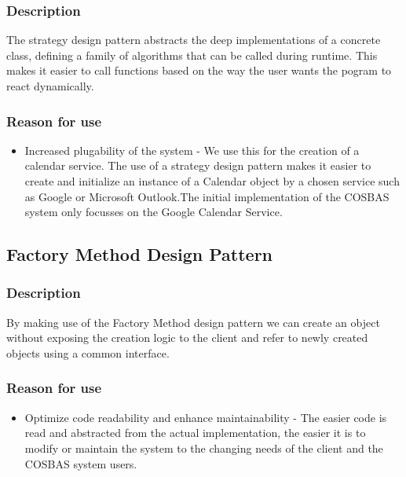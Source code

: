 	\subsubsection{Description}
	The strategy design pattern abstracts the deep implementations of a concrete class, defining a family of algorithms that can be called during runtime. This makes it easier to call functions based on the way the user wants the pogram to react dynamically.
	
	
	\subsubsection{Reason for use}
	\begin{itemize}
		\item{Increased plugability of the system} - We use this for the creation of a calendar service. The use of a strategy design pattern makes it easier to create and initialize an instance of a Calendar object by a chosen service such as Google or Microsoft Outlook.The initial implementation of the COSBAS system only focusses on the Google Calendar Service.
	\end{itemize}
	
\subsection{Factory Method Design Pattern}
	\subsubsection{Description}
	By making use of the Factory Method design pattern we can create an object without exposing the creation logic to the client and refer to newly created objects using a common interface.
	
	\subsubsection{Reason for use}
	\begin{itemize}
		\item{Optimize code readability and enhance maintainability} - The easier code is read and abstracted from the actual implementation, the easier it is to modify or maintain the system to the changing needs of the client and the COSBAS system users. 
	\end{itemize}